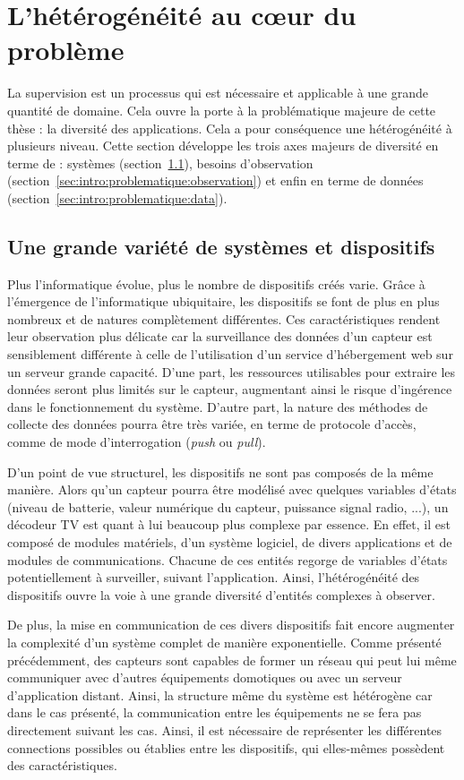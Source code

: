 \section{L'hétérogénéité au cœur du problème}\label{sec:intro:problematique}
La supervision est un processus qui est nécessaire et applicable à une grande quantité de domaine. Cela ouvre la porte à la problématique majeure de cette thèse : la diversité des applications. Cela a pour conséquence une hétérogénéité à plusieurs niveau. Cette section développe les trois axes majeurs de diversité en terme de : systèmes (section~\ref{sec:intro:problematique:devices}), besoins d'observation (section~\ref{sec:intro:problematique:observation}) et enfin en terme de données (section~\ref{sec:intro:problematique:data}).

\subsection{Une grande variété de systèmes et dispositifs}\label{sec:intro:problematique:devices}
Plus l'informatique évolue, plus le nombre de dispositifs créés varie. Grâce à l'émergence de l'informatique ubiquitaire, les dispositifs se font de plus en plus nombreux et de natures complètement différentes. Ces caractéristiques rendent leur observation plus délicate car la surveillance des données d'un capteur est sensiblement différente à celle de l'utilisation d'un service d'hébergement web sur un serveur grande capacité. D'une part, les ressources utilisables pour extraire les données seront plus limités sur le capteur, augmentant ainsi le risque d'ingérence dans le fonctionnement du système. D'autre part, la nature des méthodes de collecte des données pourra être très variée, en terme de protocole d'accès, comme de mode d'interrogation (\textit{push} ou \textit{pull}).

D'un point de vue structurel, les dispositifs ne sont pas composés de la même manière. Alors qu'un capteur pourra être modélisé avec quelques variables d'états (niveau de batterie, valeur numérique du capteur, puissance signal radio, ...), un décodeur TV est quant à lui beaucoup plus complexe par essence. En effet, il est composé de modules matériels, d'un système logiciel, de divers applications et de modules de communications. Chacune de ces entités regorge de variables d'états potentiellement à surveiller, suivant l'application. Ainsi, l'hétérogénéité des dispositifs ouvre la voie à une grande diversité d'entités complexes à observer.

De plus, la mise en communication de ces divers dispositifs fait encore augmenter la complexité d'un système complet de manière exponentielle. Comme présenté précédemment, des capteurs sont capables de former un réseau qui peut lui même communiquer avec d'autres équipements domotiques ou avec un serveur d'application distant. Ainsi, la structure même du système est hétérogène car dans le cas présenté, la communication entre les équipements ne se fera pas directement suivant les cas. Ainsi, il est nécessaire de représenter les différentes connections possibles ou établies entre les dispositifs, qui elles-mêmes possèdent des caractéristiques. 

